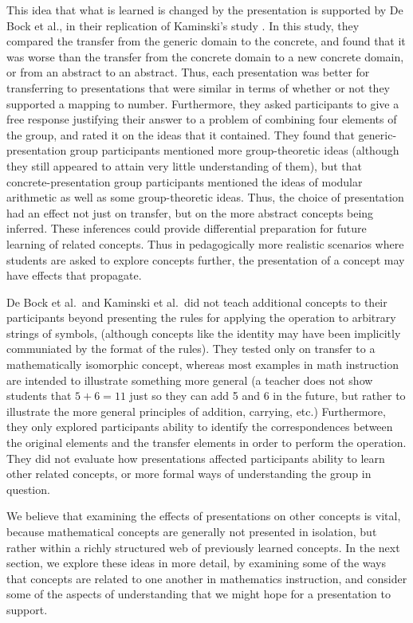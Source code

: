 \documentclass[man,10pt]{apa6}
\begin{document}
This idea that what is learned is changed by the presentation is supported by De Bock et al., in their replication of Kaminski's study \cite{DeBock2011}. In this study, they compared the transfer from the generic domain to the concrete, and found that it was worse than the transfer from the concrete domain to a new concrete domain, or from an abstract to an abstract. Thus, each presentation was better for transferring to presentations that were similar in terms of whether or not they supported a mapping to number. Furthermore, they asked participants to give a free response justifying their answer to a problem of combining four elements of the group, and rated it on the ideas that it contained. They found that generic-presentation group participants mentioned more group-theoretic ideas (although they still appeared to attain very little understanding of them), but that concrete-presentation group participants mentioned the ideas of modular arithmetic as well as some group-theoretic ideas. Thus, the choice of presentation had an effect not just on transfer, but on the more abstract concepts being inferred. These inferences could provide differential preparation for future learning \cite{Bransford1999} of related concepts. Thus in pedagogically more realistic scenarios where students are asked to explore concepts further, the presentation of a concept may have effects that propagate. \par
De Bock et al.\ and Kaminski et al.\ did not teach additional concepts to their participants beyond presenting the rules for applying the operation to arbitrary strings of symbols, (although concepts like the identity may have been implicitly communiated by the format of the rules). They tested only on transfer to a mathematically isomorphic concept, whereas most examples in math instruction are intended to illustrate something more general (a teacher does not show students that $5+6 = 11$ just so they can add 5 and 6 in the future, but rather to illustrate the more general principles of addition, carrying, etc.) Furthermore, they only explored participants ability to identify the correspondences between the original elements and the transfer elements in order to perform the operation. They did not evaluate how presentations affected participants ability to learn other related concepts, or more formal ways of understanding the group in question.\par
We believe that examining the effects of presentations on other concepts is vital, because mathematical concepts are generally not presented in isolation, but rather within a richly structured web of previously learned concepts. In the next section, we explore these ideas in more detail, by examining some of the ways that concepts are related to one another in mathematics instruction, and consider some of the aspects of understanding that we might hope for a presentation to support. 
\end{document}
